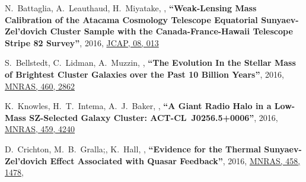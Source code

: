 \documentclass{article}
\def\myself{\textbf{\color{red} C.~Sif\'on}}
\def\jcap{JCAP}
\def\mnras{MNRAS}
\begin{document}
\begin{etaremune}
\item
N.~Battaglia, A.~Leauthaud, H.~Miyatake, ,
\textbf{``Weak-Lensing Mass Calibration of the Atacama Cosmology Telescope Equatorial 
Sunyaev-Zel'dovich Cluster Sample with the Canada-France-Hawaii Telescope Stripe 82 Survey''},
2016, \href{http://adsabs.harvard.edu/abs/2016JCAP...08..013B}{\jcap, 08, 013}


\item
S.~Bellstedt, C.~Lidman, A.~Muzzin, ,
\textbf{``The Evolution In the Stellar Mass of Brightest Cluster Galaxies over the Past 10 Billion Years''},
2016, \href{http://adsabs.harvard.edu/abs/2016MNRAS.460.2862B}{\mnras, 460, 2862}


\item
K.~Knowles, H.~T.~Intema, A.~J.~Baker, ,
\textbf{``A Giant Radio Halo in a Low-Mass SZ-Selected Galaxy Cluster: ACT-CL~J0256.5+0006''},
2016, \href{http://adsabs.harvard.edu/adsabs/abs/2016MNRAS.459.4240K}{\mnras, 459, 4240}

\item
D.~Crichton, M.~B.~Gralla;, K.~Hall, ,
\textbf{``Evidence for the Thermal Sunyaev-Zel'dovich Effect Associated with Quasar Feedback''},
2016, \href{http://adsabs.harvard.edu/abs/2016MNRAS.458.1478C}{\mnras, 458, 1478},


\end{etaremune}
\end{document}
